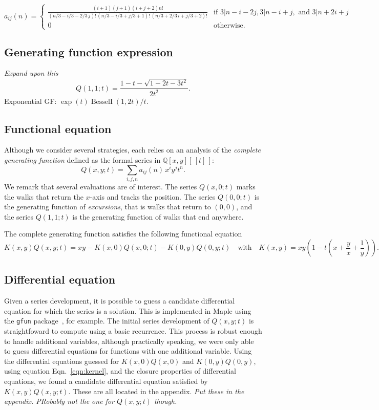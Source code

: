 \documentclass[11pt]{article}
\newcommand\mjm[1]{\mbox{}
{\marginpar{\color{red!50}$\EuScript{M}$}}
{\it\noindent\color{red!50}#1}}%
\begin{document}
\begin{equation}
\label{eqn:exact}a_{ij}(n)=
\begin{cases}{\frac { \left( i+1 \right)  \left( j+1 \right)  \left( i+j+2 \right) 
n!}{ \left( n/3-i/3-2/3\,j \right) !\, \left( n/3-i/3+j/3+1 \right) !
\, \left( n/3+2/3\,i+j/3+2 \right) !}}
& \mbox{if } 3|n-i-2j, 3|n-i+j, \mbox{ and } 3|n+2i+j \\
0 & \mbox{otherwise}.
\end{cases}
\end{equation}

\subsection{Generating function expression}
\mjm{Expand upon this}
\[
Q(1,1; t) = \frac{ 1 - t - \sqrt{1-2t-3t^2}}{2t^2}.
\]
Exponential GF: $\exp(t)\operatorname{BesselI}(1, 2t)/t$.

\subsection{Functional equation}
Although we consider several strategies, each relies on an analysis of the
\emph{complete generating function\/} defined as the formal series in
$\mathbb{Q}[x, y][\,[t]\,]$: 
\[
Q(x,y;t)=\sum_{i,j,n} a_{ij}(n)\, x^i y^j t^n.
\]
We remark that several evaluations are of interest. The series
$Q(x,0;t)$ marks the walks that return the $x$-axis and tracks the
position.  The series $Q(0,0;t)$ is the generating function of
\emph{excursions}, that is walks that return to $(0,0)$, and the
series $Q(1,1;t)$ is the generating function of walks that end
anywhere.

The complete generating function satisfies the following functional
equation  
\begin{equation}
\label{eqn:kernel}
K(x,y)Q(x,y;t)=xy - K(x,0)Q(x,0;t) -K(0,y)Q(0,y;t) \quad \mbox{with}
\quad K(x,y)= xy(1-t(x+\frac{y}{x} +\frac{1}{y})).
\end{equation}

\subsection{Differential equation}
Given a series development, it is possible to guess a candidate
differential equation for which the series is a solution. This is
implemented in Maple using the {\tt gfun} package~\cite{}, for example. The
initial series development of $Q(x,y;t)$ is straightfoward to compute
using a basic recurrence. This process is robust enough to handle
additional variables, although practically speaking, we were only able
to guess differential equations for functions with one additional
variable. Using the differential equations guessed for $K(x,0)Q(x,0)$
and $K(0,y)Q(0,y)$, using equation Eqn.~\eqref{eqn:kernel}, and the
closure properties of differential equations, we found a candidate
differential equation satisfied by $K(x,y)Q(x,y;t)$. These are all
located in the appendix. \mjm{Put these in the appendix. PRobably not
  the one for $Q(x,y;t)$ though.}
\end{document}
